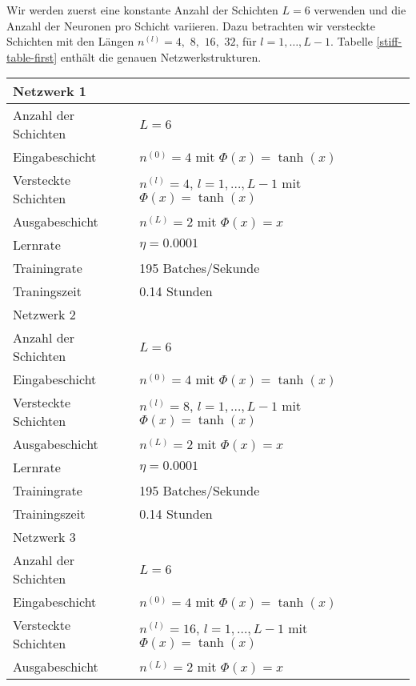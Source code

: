 Wir werden zuerst eine konstante Anzahl der Schichten $L=6$ verwenden und die Anzahl der Neuronen pro Schicht variieren.
Dazu betrachten wir versteckte Schichten mit den Längen
$n^{(l)} = 4,$ $8,$ $16,$ $32$, für $l = 1, \dots, L-1$. Tabelle \ref{stiff-table-first} enthält die genauen
Netzwerkstrukturen.
\begin{table}
       \renewcommand{\arraystretch}{1.0}
       \centering
       \begin{tabular}{ l | l }
              \hline
              Netzwerk 1 & \\
              \hline
              Anzahl der Schichten & $L=6$ \\
              Eingabeschicht & $n^{(0)}=4$ mit $\Phi(x)=\tanh(x)$ \\
              Versteckte Schichten & $n^{(l)}=4$, $l = 1, \dots, L-1$ mit $\Phi(x)=\tanh(x)$ \\
              Ausgabeschicht & $n^{(L)}=2$ mit $\Phi(x)=x$ \\
              Lernrate & $\eta=0.0001$ \\
              Trainingrate & 195 Batches/Sekunde \\
              Traningszeit & 0.14 Stunden \\
              \hline
              Netzwerk 2 & \\
              \hline
              Anzahl der Schichten & $L=6$ \\
              Eingabeschicht & $n^{(0)}=4$ mit $\Phi(x)=\tanh(x)$ \\
              Versteckte Schichten & $n^{(l)}=8$, $l = 1, \dots, L-1$ mit $\Phi(x)=\tanh(x)$ \\
              Ausgabeschicht & $n^{(L)}=2$ mit $\Phi(x)=x$ \\
              Lernrate & $\eta=0.0001$ \\
              Trainingrate & 195 Batches/Sekunde \\
              Trainingszeit & 0.14 Stunden \\
              \hline
              Netzwerk 3 & \\
              \hline
              Anzahl der Schichten & $L=6$ \\
              Eingabeschicht & $n^{(0)}=4$ mit $\Phi(x)=\tanh(x)$ \\
              Versteckte Schichten & $n^{(l)}=16$, $l = 1, \dots, L-1$ mit $\Phi(x)=\tanh(x)$ \\
              Ausgabeschicht & $n^{(L)}=2$ mit $\Phi(x)=x$ \\

\end{tabular}
\end{table}
